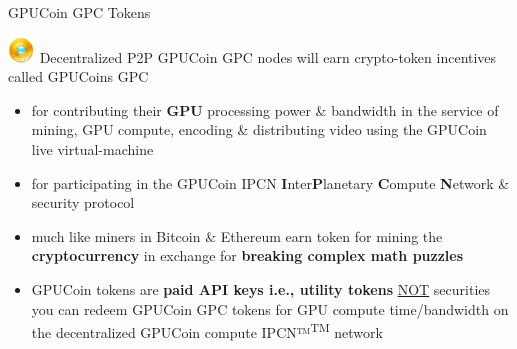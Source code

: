 
\begin{frame}[t]{GPUCoin GPC Tokens }
 
\includegraphics{./static/hootcoin-small.png} Decentralized P2P	 GPUCoin GPC nodes will earn crypto-token incentives called GPUCoins GPC

 \begin{itemize}[<+-| alert@+>]
 \item for contributing their \textbf{GPU} processing power \& bandwidth in the service of mining, GPU compute, encoding \& distributing video using the GPUCoin live virtual-machine 
 \item for participating in the GPUCoin IPCN \textbf{I}nter\textbf{P}lanetary \textbf{C}ompute \textbf{N}etwork \& security protocol
 \item much like miners in Bitcoin \& Ethereum earn token for mining the \textbf{cryptocurrency} in exchange for \textbf{breaking complex math puzzles}
 \item GPUCoin tokens are \textbf{paid API keys i.e., utility tokens} \underline{NOT} securities you can redeem GPUCoin GPC tokens for GPU compute time/bandwidth on the decentralized GPUCoin compute IPCN™\textsuperscript{TM} network
 \end{itemize}
 
\end{frame}